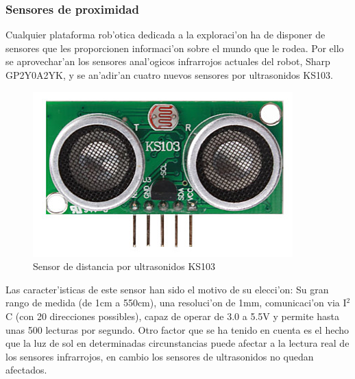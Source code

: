 \documentclass[twoside,12pt]{article}
\begin{document}
\subsubsection{Sensores de proximidad}
Cualquier plataforma rob'otica dedicada a la exploraci'on ha de disponer de sensores que les proporcionen informaci'on sobre el mundo que le rodea. Por ello se aprovechar'an los sensores anal'ogicos infrarrojos actuales del robot, Sharp GP2Y0A2YK, y se an'adir'an cuatro nuevos sensores por ultrasonidos KS103.\\

\begin{figure}[ht]
\centering
\includegraphics[scale=0.40]{images/KS103.png}
\caption{Sensor de distancia por ultrasonidos KS103}
\label{fig:KS103}
\end{figure} 

Las caracter'isticas de este sensor han sido el motivo de su elecci'on: Su gran rango de medida (de 1cm a 550cm), una resoluci'on de 1mm, comunicaci'on via I${^2}$C (con 20 direcciones possibles), capaz de operar de 3.0 a 5.5V y permite hasta unas 500 lecturas por segundo. Otro factor que se ha tenido en cuenta es el hecho que la luz de sol en determinadas circunstancias puede afectar a la lectura real de los sensores infrarrojos, en cambio los sensores de ultrasonidos no quedan afectados.\\
\end{document}
